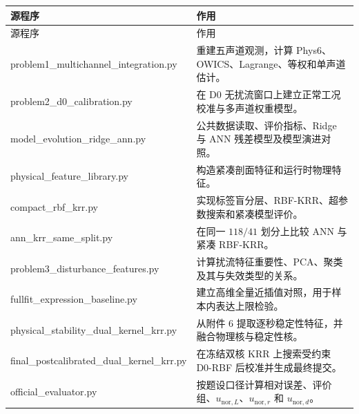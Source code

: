 \begingroup
\scriptsize
\setlength{\tabcolsep}{3pt}
\renewcommand{\arraystretch}{1.08}
\begin{longtable}{p{}p{}}
\toprule
源程序 & 作用 \\
\midrule
\endfirsthead
\toprule
源程序 & 作用 \\
\midrule
\endhead
{\ttfamily\raggedright problem1\_multichannel\_\allowbreak integration.py\par} & 重建五声道观测，计算 Phys6、OWICS、Lagrange、等权和单声道估计。 \\
{\ttfamily\raggedright problem2\_d0\_\allowbreak calibration.py\par} & 在 D0 无扰流窗口上建立正常工况校准与多声道权重模型。 \\
{\ttfamily\raggedright model\_evolution\_\allowbreak ridge\_ann.py\par} & 公共数据读取、评价指标、Ridge 与 ANN 残差模型及模型演进对照。 \\
{\ttfamily\raggedright physical\_feature\_\allowbreak library.py\par} & 构造紧凑剖面特征和运行时物理特征。 \\
{\ttfamily\raggedright compact\_rbf\_krr.py\par} & 实现标签盲分层、RBF-KRR、超参数搜索和紧凑模型评价。 \\
{\ttfamily\raggedright ann\_krr\_same\_split.py\par} & 在同一 $118/41$ 划分上比较 ANN 与紧凑 RBF-KRR。 \\
{\ttfamily\raggedright problem3\_disturbance\_\allowbreak features.py\par} & 计算扰流特征重要性、PCA、聚类及其与失效类型的关系。 \\
{\ttfamily\raggedright fullfit\_expression\_\allowbreak baseline.py\par} & 建立高维全量近插值对照，用于样本内表达上限检验。 \\
{\ttfamily\raggedright physical\_stability\_\allowbreak dual\_kernel\_krr.py\par} & 从附件 6 提取逐秒稳定性特征，并融合物理核与稳定性核。 \\
{\ttfamily\raggedright final\_postcalibrated\_\allowbreak dual\_kernel\_krr.py\par} & 在冻结双核 KRR 上搜索受约束 D0-RBF 后校准并生成最终提交。 \\
{\ttfamily\raggedright official\_evaluator.py\par} & 按题设口径计算相对误差、评价组、$u_{\mathrm{nor},L}$、$u_{\mathrm{nor},r}$ 和 $u_{\mathrm{nor},d}$。 \\
\bottomrule
\end{longtable}
\endgroup

